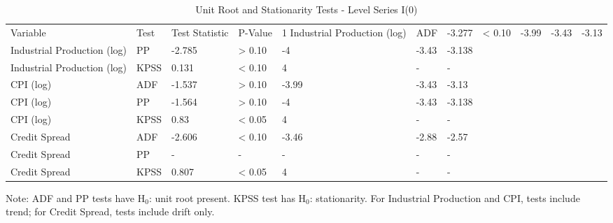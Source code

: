 \begin{table}[htbp]
\centering
\caption{Unit Root and Stationarity Tests - Level Series I(0)}
\label{tab:unit_root_level}
\begin{tabular}{lllllll}
  \toprule
Variable & Test & Test Statistic & P-Value & 1%
  \midrule
Industrial Production (log) & ADF & -3.277 & < 0.10 & -3.99 & -3.43 & -3.13 \\ 
  Industrial Production (log) & PP & -2.785 & > 0.10 & -4 & -3.43 & -3.138 \\ 
  Industrial Production (log) & KPSS & 0.131 & < 0.10 & 4 & - & - \\ 
  CPI (log) & ADF & -1.537 & > 0.10 & -3.99 & -3.43 & -3.13 \\ 
  CPI (log) & PP & -1.564 & > 0.10 & -4 & -3.43 & -3.138 \\ 
  CPI (log) & KPSS & 0.83 & < 0.05 & 4 & - & - \\ 
  Credit Spread & ADF & -2.606 & < 0.10 & -3.46 & -2.88 & -2.57 \\ 
  Credit Spread & PP & - & - & - & - & - \\ 
  Credit Spread & KPSS & 0.807 & < 0.05 & 4 & - & - \\ 
   \bottomrule
\end{tabular}
\begin{tablenotes}
\small
\item Note: ADF and PP tests have H$_0$: unit root present. KPSS test has H$_0$: stationarity. For Industrial Production and CPI, tests include trend; for Credit Spread, tests include drift only.
\end{tablenotes}
\end{table}

